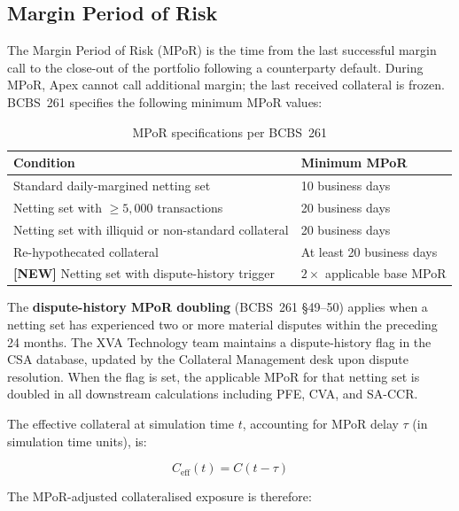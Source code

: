\documentclass[11pt,a4paper]{article}
\begin{document}
\subsection{Margin Period of Risk}
\label{sec:mpor}

The Margin Period of Risk (MPoR) is the time from the last successful margin
call to the close-out of the portfolio following a counterparty default. During
MPoR, Apex cannot call additional margin; the last received collateral is
frozen. BCBS~261 specifies the following minimum MPoR values:

\begin{table}[h!]
\centering
\begin{tabular}{@{}ll@{}}
\toprule
\textbf{Condition} & \textbf{Minimum MPoR} \\
\midrule
Standard daily-margined netting set & 10 business days \\
Netting set with $\geq 5{,}000$ transactions & 20 business days \\
Netting set with illiquid or non-standard collateral & 20 business days \\
Re-hypothecated collateral & At least 20 business days \\
\textbf{[NEW]} Netting set with dispute-history trigger & $2\times$ applicable base MPoR \\
\bottomrule
\end{tabular}
\caption{MPoR specifications per BCBS~261}
\end{table}

The \textbf{dispute-history MPoR doubling} (BCBS~261 \S49--50) applies when a
netting set has experienced two or more material disputes within the preceding
24 months. The XVA Technology team maintains a dispute-history flag in the CSA
database, updated by the Collateral Management desk upon dispute resolution.
When the flag is set, the applicable MPoR for that netting set is doubled in
all downstream calculations including PFE, CVA, and SA-CCR.

The effective collateral at simulation time $t$, accounting for MPoR delay
$\tau$ (in simulation time units), is:

\begin{equation}
  C_{\text{eff}}(t) = C(t - \tau)
  \label{eq:coleff}
\end{equation}

The MPoR-adjusted collateralised exposure is therefore:
\end{document}
